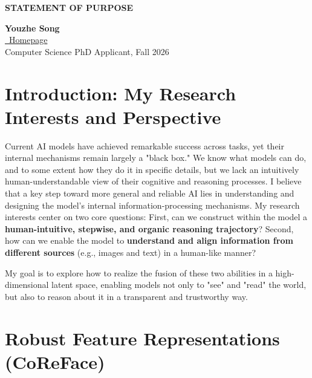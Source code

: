 \documentclass[11pt, letterpaper]{article}
\begin{document}
\noindent %
\begin{minipage}[t]{0.6\textwidth} %
    \raggedright
    \textbf{STATEMENT OF PURPOSE} \\
\end{minipage}%
\begin{minipage}[t]{0.5\textwidth} %
    \raggedleft
    \textbf{Youzhe Song} \\ %
    \href{https://isidoresong.github.io/}{\small\faHome\ Homepage} \\
    Computer Science PhD Applicant, Fall 2026 %
\end{minipage}

\vspace{2.5em} %

\section{Introduction: My Research Interests and Perspective}

Current AI models have achieved remarkable success across tasks, yet their internal mechanisms remain largely a "black box." We know what models can do, and to some extent how they do it in specific details, but we lack an intuitively human-understandable view of their cognitive and reasoning processes. I believe that a key step toward more general and reliable AI lies in understanding and designing the model's internal information-processing mechanisms. My research interests center on two core questions: First, can we construct within the model a \textbf{human-intuitive, stepwise, and organic reasoning trajectory}? Second, how can we enable the model to \textbf{understand and align information from different sources} (e.g., images and text) in a human-like manner?

My goal is to explore how to realize the fusion of these two abilities in a high-dimensional latent space, enabling models not only to "see" and "read" the world, but also to reason about it in a transparent and trustworthy way.

\section{Robust Feature Representations (CoReFace)}
\end{document}
